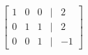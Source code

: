 \documentclass[preview]{standalone}
\begin{document}
\begin{align*}
\begin{bmatrix} 1 & 0 & 0 & | & 2 \\ 0 & 1 & 1 & | & 2 \\ 0 & 0 & 1 & | & -1 \end{bmatrix}
\end{align*}
\end{document}
